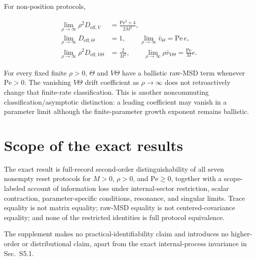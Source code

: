 For non-position protocols,

\[
\begin{aligned}
\lim_{\rho\to\infty}\rho^2D_{\mathrm{eff},V}
&=\frac{\mathrm{Pe}^2+4}{2M^2},\\
\lim_{\rho\to\infty}D_{\mathrm{eff},\Theta}
&=1,\qquad
\lim_{\rho\to\infty}\bar v_\Theta=\mathrm{Pe}\,e,\\
\lim_{\rho\to\infty}\rho^2D_{\mathrm{eff},V\Theta}
&=\frac2{M^2},\qquad
\lim_{\rho\to\infty}\rho\bar v_{V\Theta}
=\frac{\mathrm{Pe}}{M}e.
\end{aligned}
\]

For every fixed finite \(\rho>0\), \(\Theta\) and \(V\Theta\) have a ballistic raw-MSD term whenever \(\mathrm{Pe}>0\). The vanishing \(V\Theta\) drift coefficient as \(\rho\to\infty\) does not retroactively change that finite-rate classification. This is another noncommuting classification/asymptotic distinction: a leading coefficient may vanish in a parameter limit although the finite-parameter growth exponent remains ballistic.

\section{Scope of the exact results}\label{s7.-claim-boundary}

The exact result is full-record second-order distinguishability of all seven nonempty reset protocols for \(M>0\), \(\rho>0\), and \(\mathrm{Pe}\ge0\), together with a scope-labeled account of information loss under internal-sector restriction, scalar contraction, parameter-specific conditions, resonance, and singular limits. Trace equality is not matrix equality; raw-MSD equality is not centered-covariance equality; and none of the restricted identities is full protocol equivalence.

The supplement makes no practical-identifiability claim and introduces no higher-order or distributional claim, apart from the exact internal-process invariance in Sec.~S5.1.
